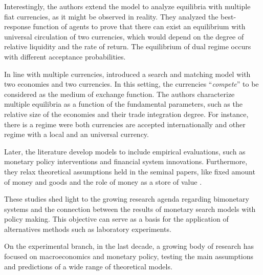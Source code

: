 Interestingly, the authors extend the model to analyze equilibria with multiple fiat currencies, as it might be observed in reality. They analyzed the best-response function of agents to prove that there can exist an equilibrium with universal circulation of two currencies, which would depend on the degree of relative liquidity and the rate of return. The equilibrium of dual regime occurs with different acceptance probabilities.

In line with multiple currencies, \cite{MKM} introduced a search and matching model with two economies and two currencies. In this setting, the currencies ``\textit{compete}'' to be considered as the medium of exchange function. The authors characterize multiple equilibria as a function of the fundamental parameters, such as the relative size of the economies and their trade integration degree. For instance, there is a regime were both currencies are accepted internationally and other regime with a local and an universal currency.

Later, the literature develop models to include empirical evaluations, such as monetary policy interventions and financial system innovations. Furthermore, they relax theoretical assumptions held in the seminal papers, like fixed amount of money and goods and the role of money as a store of value \cite{RePEc:fip:fedcer:y:2000:i:qi:p:2-13,RePEc:ucp:jpolec:v:113:y:2005:i:3:p:463-484}.

These studies shed light to the growing research agenda regarding bimonetary systems and the connection between the results of monetary search models with policy making. This objective can serve as a basis for the application of alternatives methods such as laboratory experiments.




On the experimental branch, in the last decade, a growing body of research has focused on macroeconomics and monetary policy, testing the main assumptions and predictions of a wide range of theoretical models. 

